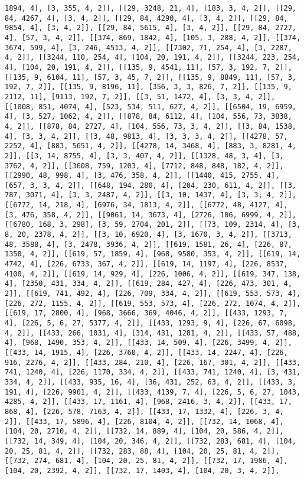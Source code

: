 \documentclass[12pt,fleqn]{article}\usepackage{../../common}
\begin{document}
\begin{verbatim}
1894, 4], [3, 355, 4, 2]], [[29, 3248, 21, 4], [183, 3, 4, 2]], [[29, 84, 4267, 4], [3, 4, 2]], [[29, 84, 4290, 4], [3, 4, 2]], [[29, 84, 9854, 4], [3, 4, 2]], [[29, 84, 5615, 4], [3, 4, 2]], [[29, 84, 2727, 4], [57, 3, 4, 2]], [[374, 869, 1842, 4], [105, 3, 288, 4, 2]], [[374, 3674, 599, 4], [3, 246, 4513, 4, 2]], [[7302, 71, 254, 4], [3, 2287, 4, 2]], [[3244, 110, 254, 4], [104, 20, 191, 4, 2]], [[3244, 223, 254, 4], [104, 20, 191, 4, 2]], [[135, 9, 4541, 11], [57, 3, 192, 7, 2]], [[135, 9, 6104, 11], [57, 3, 45, 7, 2]], [[135, 9, 8849, 11], [57, 3, 192, 7, 2]], [[135, 9, 8196, 11], [356, 3, 3, 826, 7, 2]], [[135, 9, 2112, 11], [9113, 192, 7, 2]], [[3, 51, 1472, 4], [3, 3, 4, 2]], [[1008, 851, 4074, 4], [523, 534, 511, 627, 4, 2]], [[6504, 19, 6959, 4], [3, 527, 1062, 4, 2]], [[878, 84, 6112, 4], [104, 556, 73, 3838, 4, 2]], [[878, 84, 2727, 4], [104, 556, 73, 3, 4, 2]], [[3, 84, 1538, 4], [3, 3, 4, 2]], [[3, 48, 9813, 4], [3, 3, 3, 4, 2]], [[4278, 57, 2252, 4], [883, 5651, 4, 2]], [[4278, 14, 3468, 4], [883, 3, 8281, 4, 2]], [[3, 14, 8755, 4], [3, 3, 407, 4, 2]], [[1328, 48, 3, 4], [3, 3762, 4, 2]], [[3608, 759, 1203, 4], [7712, 848, 848, 182, 4, 2]], [[2990, 48, 998, 4], [3, 476, 358, 4, 2]], [[1440, 415, 2755, 4], [657, 3, 3, 4, 2]], [[648, 194, 280, 4], [204, 230, 611, 4, 2]], [[3, 787, 3071, 4], [3, 3, 2487, 4, 2]], [[3, 10, 1437, 4], [3, 3, 4, 2]], [[6772, 14, 218, 4], [6976, 34, 1813, 4, 2]], [[6772, 48, 4127, 4], [3, 476, 358, 4, 2]], [[9061, 14, 3673, 4], [2726, 106, 6999, 4, 2]], [[6780, 168, 3, 298], [3, 59, 2704, 201, 2]], [[73, 109, 2314, 4], [3, 8, 20, 2378, 4, 2]], [[3, 10, 6920, 4], [3, 1670, 3, 4, 2]], [[3713, 48, 3588, 4], [3, 2478, 3936, 4, 2]], [[619, 1581, 26, 4], [226, 87, 1350, 4, 2]], [[619, 57, 1859, 4], [968, 9580, 353, 4, 2]], [[619, 14, 4742, 4], [226, 6733, 367, 4, 2]], [[619, 14, 1197, 4], [226, 8537, 4100, 4, 2]], [[619, 14, 929, 4], [226, 1006, 4, 2]], [[619, 347, 138, 4], [2350, 431, 334, 4, 2]], [[619, 284, 427, 4], [226, 473, 301, 4, 2]], [[619, 741, 492, 4], [226, 709, 334, 4, 2]], [[619, 553, 573, 4], [226, 272, 1155, 4, 2]], [[619, 553, 573, 4], [226, 272, 1074, 4, 2]], [[619, 17, 2800, 4], [968, 3666, 369, 4046, 4, 2]], [[433, 1293, 7, 4], [226, 5, 6, 27, 5377, 4, 2]], [[433, 1293, 9, 4], [226, 67, 6098, 4, 2]], [[433, 266, 1031, 4], [314, 431, 1281, 4, 2]], [[433, 57, 488, 4], [968, 1490, 353, 4, 2]], [[433, 14, 509, 4], [226, 3499, 4, 2]], [[433, 14, 1915, 4], [226, 3760, 4, 2]], [[433, 14, 2247, 4], [226, 916, 2276, 4, 2]], [[433, 284, 210, 4], [226, 167, 301, 4, 2]], [[433, 741, 1240, 4], [226, 1170, 334, 4, 2]], [[433, 741, 1240, 4], [3, 431, 334, 4, 2]], [[433, 935, 16, 4], [36, 431, 252, 63, 4, 2]], [[433, 3, 191, 4], [226, 9901, 4, 2]], [[433, 4139, 7, 4], [226, 5, 6, 27, 1043, 4285, 4, 2]], [[433, 17, 1161, 4], [968, 2416, 3, 4, 2]], [[433, 17, 868, 4], [226, 578, 7163, 4, 2]], [[433, 17, 1332, 4], [226, 3, 4, 2]], [[433, 17, 5896, 4], [226, 8104, 4, 2]], [[732, 14, 1068, 4], [104, 20, 2710, 4, 2]], [[732, 14, 889, 4], [104, 20, 586, 4, 2]], [[732, 14, 349, 4], [104, 20, 346, 4, 2]], [[732, 283, 681, 4], [104, 20, 25, 81, 4, 2]], [[732, 283, 88, 4], [104, 20, 25, 81, 4, 2]], [[732, 274, 681, 4], [104, 20, 25, 81, 4, 2]], [[732, 17, 1986, 4], [104, 20, 2392, 4, 2]], [[732, 17, 1403, 4], [104, 20, 3, 4, 2]], 
\end{verbatim}
\end{document}
